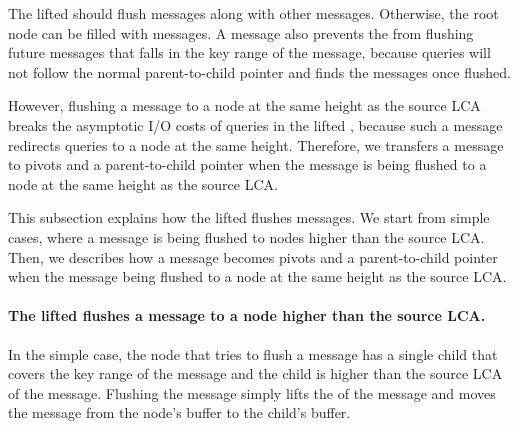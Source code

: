 The lifted \bedag should flush \goto messages along with other messages.
Otherwise, the root node can be filled with \goto messages.
A \goto message also prevents the \bet from flushing future messages that falls
in the key range of the \goto message,
because queries will not follow the normal parent-to-child pointer and finds
the messages once flushed.

However, flushing a \goto message to a node at the same height as the source
LCA breaks the asymptotic I/O costs of queries in the lifted \bedag,
because such a \goto message redirects queries to a node at the same height.
Therefore, we transfers a \goto message to pivots and a parent-to-child pointer
when the \goto message is being flushed to a node at the same height as the
source LCA.

This subsection explains how the lifted \bedag flushes \goto messages.
We start from simple cases, where a \goto message is being flushed to nodes
higher than the source LCA.
Then, we describes how a \goto message becomes pivots and a parent-to-child
pointer when the \goto message being flushed to a node at the same height as
the source LCA.

\paragraph{The lifted \bedag flushes a \goto message to a node higher than
the source LCA.}
In the simple case, the node that tries to flush a \goto message has a single
child that covers the key range of the \goto message
and the child is higher than the source LCA of the \goto message.
Flushing the \goto message simply lifts the \dpre of the \goto message and moves
the \goto message from the node's buffer to the child's buffer.

